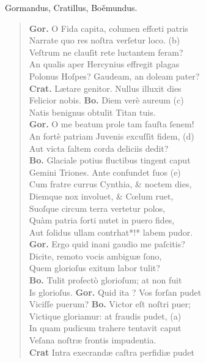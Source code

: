\documentclass[a4paper,12pt]{article}
\begin{document}
Gormandus, Cratillus, Boěmundus.
\begin{verse}
\textbf{Gor.} O Fida capita, columen effœti patris\\[0pt]
Narrate quo res noſtra verſetur loco. (b)\footnotemark\\[0pt]
Veſtrum ne clauſit rete luctantem feram?\\[0pt]
An qualis aper Hercynius effregit plagas\\[0pt]
Polonus Hoſpes? Gaudeam, an doleam pater?\\[0pt]
\textbf{Crat.} Lætare genitor. Nullus illuxit dies\\[0pt]
Felicior nobis. \textbf{Bo.} Diem verè aureum (c)\footnotemark\\[0pt]
Natis benignus obtulit Titan tuis.\\[0pt]
\textbf{Gor.} O me beatum prole tam fauſta ſenem!\\[0pt]
An fortè patriam Juvenis excuſſit fidem, (d)\footnotemark\\[0pt]
Aut victa ſaltem corda deliciis dedit?\\[0pt]
\textbf{Bo.} Glaciale potius fluctibus tingent caput\\[0pt]
Gemini Triones. Ante confundet ſuos (e)\footnotemark\\[0pt]
Cum fratre currus Cynthia, \& noctem dies,\\[0pt]
Diemque nox involuet, \& Cœlum ruet,\\[0pt]
Suoſque circum terra vertetur polos,\\[0pt]
Quàm patria forti nutet in puero fides,\\[0pt]
Aut ſolidus ullam contrhat*!* labem pudor.\\[0pt]
\textbf{Gor.} Ergo quid inani gaudio me paſcitis?\\[0pt]
Dicite, remoto vocis ambiguæ ſono,\\[0pt]
Quem glorioſus exitum labor tulit?\\[0pt]
\textbf{Bo.} Tulit profectò glorioſum; at non fuit\\[0pt]
Is glorioſus. \textbf{Gor.} Quid ita ? Vos forſan pudet\\[0pt]
Viciſſe puerum? \textbf{Bo.} Victor eſt noſtri puer;\\[0pt]
Victique gloriamur: at fraudis pudet, (a)\footnotemark\\[0pt]
In quam pudicum trahere tentavit caput\\[0pt]
Veſana noſtræ ſrontis impudentia.\\[0pt]
\textbf{Crat} Intra execrandæ caſtra perfidiæ pudet\\[0pt]

\end{verse}
\end{document}
